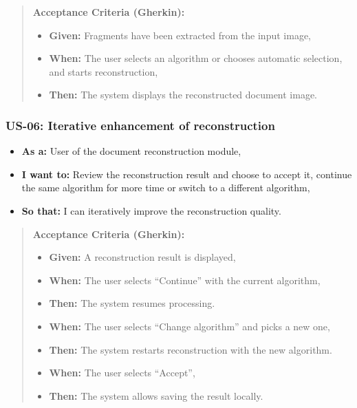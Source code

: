 \documentclass[
]{article}
\providecommand{\tightlist}{%
  \setlength{\itemsep}{0pt}\setlength{\parskip}{0pt}}
\begin{document}
\begin{quote}
\textbf{Acceptance Criteria (Gherkin):}

\begin{itemize}
\tightlist
\item
  \textbf{Given:} Fragments have been extracted from the input image,
\item
  \textbf{When:} The user selects an algorithm or chooses automatic
  selection, and starts reconstruction,
\item
  \textbf{Then:} The system displays the reconstructed document image.
\end{itemize}
\end{quote}

\subsubsection{\texorpdfstring{\textbf{US-06: Iterative enhancement of
reconstruction}}{US-06: Iterative enhancement of reconstruction}}\label{us-06-iterative-enhancement-of-reconstruction}

\begin{itemize}
\tightlist
\item
  \textbf{As a:} User of the document reconstruction module,
\item
  \textbf{I want to:} Review the reconstruction result and choose to
  accept it, continue the same algorithm for more time or switch to a
  different algorithm,
\item
  \textbf{So that:} I can iteratively improve the reconstruction
  quality.
\end{itemize}

\begin{quote}
\textbf{Acceptance Criteria (Gherkin):}

\begin{itemize}
\tightlist
\item
  \textbf{Given:} A reconstruction result is displayed,
\item
  \textbf{When:} The user selects ``Continue'' with the current
  algorithm,
\item
  \textbf{Then:} The system resumes processing.
\item
  \textbf{When:} The user selects ``Change algorithm'' and picks a new
  one,
\item
  \textbf{Then:} The system restarts reconstruction with the new
  algorithm.
\item
  \textbf{When:} The user selects ``Accept'',
\item
  \textbf{Then:} The system allows saving the result locally.
\end{itemize}
\end{quote}
\end{document}
